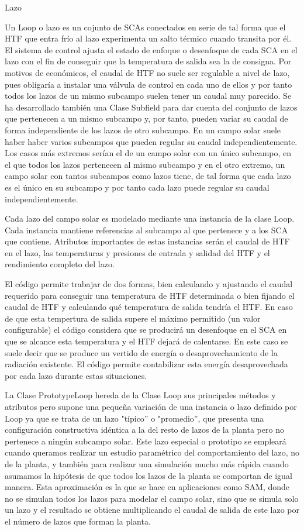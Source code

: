 \documentclass[12pt]{report} %
\begin{document}
\hypertarget{lazo}{Lazo}

Un Loop o lazo es un cojunto de SCAs conectados en serie de tal forma que el HTF que entra frío al lazo experimenta un salto térmico cuando transita por él. El sistema de control ajusta el estado de enfoque o desenfoque de cada SCA en el lazo con el fin de conseguir que la temperatura de salida sea la de consigna. Por motivos de económicos, el caudal de HTF no suele ser regulable a nivel de lazo, pues obligaría a instalar una válvula de control en cada uno de ellos y por tanto todos los lazos de un mismo subcampo suelen tener un caudal muy parecido. Se ha desarrollado también una Clase Subfield para dar cuenta del conjunto de lazos que pertenecen a un mismo subcampo y, por tanto, pueden variar su caudal de forma independiente de los lazos de otro subcampo. En un campo solar suele haber haber varios subcampos que pueden regular su caudal independientemente. Los casos más extremos serían el de un campo solar con un único subcampo, en el que todos los lazos pertenecen al mismo subcampo y en el otro extremo, un campo solar con tantos subcampos como lazos tiene, de tal forma que cada lazo es el único en su subcampo y por tanto cada lazo puede regular su caudal independientemente. 

Cada lazo del campo solar es modelado mediante una instancia de la clase Loop. Cada instancia mantiene referencias al subcampo al que pertenece y a los SCA que contiene. Atributos importantes de estas instancias serán el caudal de HTF en el lazo, las temperaturas y presiones de entrada y salidad del HTF y el rendimiento completo del lazo. 

El código permite trabajar de dos formas, bien calculando y ajustando el caudal requerido para conseguir una temperatura de HTF determinada o bien fijando el caudal de HTF y calculando qué temperatura de salida tendría el HTF. En caso de que esta tempertura de salida supere el máximo permitido (un valor configurable) el código considera que se producirá un desenfoque en el SCA en que se alcance esta temperatura y el HTF dejará de calentarse. En este caso se suele decir que se produce un vertido de energía o desaprovechamiento de la radiación existente. El código permite contabilizar esta energía desaprovechada por cada lazo durante estas situaciones. 

La Clase PrototypeLoop hereda de la Clase Loop sus principales métodos y atributos pero supone una pequeña variación de una instancia o lazo definido por Loop ya que se trata de un lazo  "típico'' o "promedio'', que presenta una configuración constructiva idéntica a la del resto de lazos de la planta pero no pertenece a ningún subcampo solar. Este lazo especial o prototipo se empleará cuando queramos realizar un estudio paramétrico del comportamiento del lazo, no de la planta, y también para realizar una simulación mucho más rápida cuando asumamos la hipótesis de que todos los lazos de la planta se comportan de igual manera. Esta aproximación es la que se hace en aplicaciones como SAM, donde no se simulan todos los lazos para modelar el campo solar, sino que se simula solo un lazo y el resultado se obtiene multiplicando el caudal de salida de este lazo por el número de lazos que forman la planta. 
\end{document}
